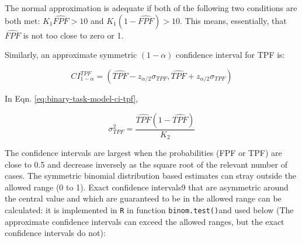\documentclass[
]{book}
\begin{document}
The normal approximation is adequate if both of the following two conditions are both met: \(K_1\widehat{FPF} > 10\) and \(K_1(1-\widehat{FPF}) > 10\). This means, essentially, that \(\widehat{FPF}\) is not too close to zero or 1.

Similarly, an approximate symmetric \((1-\alpha)\) confidence interval for TPF is:

\begin{equation} 
CI_{1-\alpha}^{TPF}=\left ( \widehat{TPF} - z_{\alpha/2} \sigma_{TPF}, \widehat{TPF} + z_{\alpha/2} \sigma_{TPF} \right )
\label{eq:binary-task-model-ci-tpf}
\end{equation}

In Eqn. \eqref{eq:binary-task-model-ci-tpf},

\begin{equation} 
\sigma_{TPF}^2 = \frac{\widehat{TPF}\left ( 1 - \widehat{TPF} \right )}{K_2}
\label{eq:binary-task-model-Var-TPF}
\end{equation}

The confidence intervals are largest when the probabilities (FPF or TPF) are close to 0.5 and decrease inversely as the square root of the relevant number of cases. The symmetric binomial distribution based estimates can stray outside the allowed range (0 to 1). Exact confidence intervals9 that are asymmetric around the central value and which are guaranteed to be in the allowed range can be calculated: it is implemented in \texttt{R} in function \texttt{binom.test()}and used below (The approximate confidence intervals can exceed the allowed ranges, but the exact confidence intervals do not):
\end{document}
